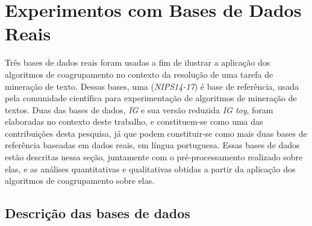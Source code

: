 \documentclass[
    12pt,                %
    oneside,            %
    a4paper,            %
    english,            %
    brazil                %
    ]{abntex2ppgsi}
\begin{document}






\section{Experimentos com Bases de Dados Reais}

Três bases de dados reais foram usadas a fim de ilustrar a aplicação dos algoritmos de coagrupamento no contexto da resolução de uma tarefa de mineração de texto.
Dessas bases, uma (\textit{NIPS14-17}) é base de referência, usada pela comunidade científica para experimentação de algoritmos de mineração de textos.
Duas das bases de dados, \textit{IG} e sua versão reduzida \textit{IG toy}, foram elaboradas no contexto deste trabalho, e constituem-se como uma das contribuições desta pesquisa, já que podem constituir-se como mais duas bases de referência baseadas em dados reais, em língua portuguesa.
Essas bases de dados estão descritas nessa seção, juntamente com o pré-processamento realizado sobre elas, e as análises quantitativas e qualitativas obtidas a partir da aplicação dos algoritmos de coagrupamento sobre elas.

\subsection{Descrição das bases de dados}
\end{document}
